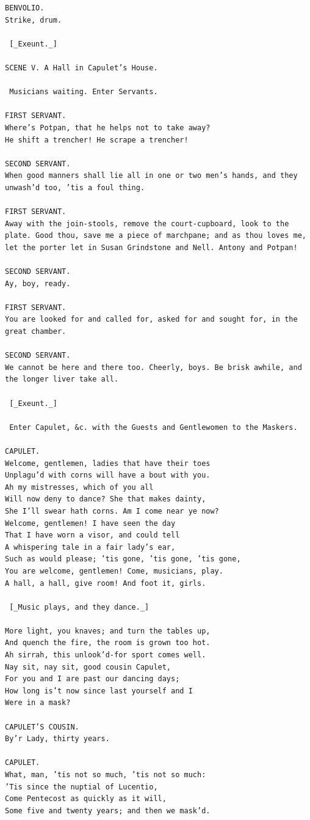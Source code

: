 \documentclass{article}
\begin{document}
\begin{verbatim}
BENVOLIO.
Strike, drum.

 [_Exeunt._]

SCENE V. A Hall in Capulet’s House.

 Musicians waiting. Enter Servants.

FIRST SERVANT.
Where’s Potpan, that he helps not to take away?
He shift a trencher! He scrape a trencher!

SECOND SERVANT.
When good manners shall lie all in one or two men’s hands, and they
unwash’d too, ’tis a foul thing.

FIRST SERVANT.
Away with the join-stools, remove the court-cupboard, look to the
plate. Good thou, save me a piece of marchpane; and as thou loves me,
let the porter let in Susan Grindstone and Nell. Antony and Potpan!

SECOND SERVANT.
Ay, boy, ready.

FIRST SERVANT.
You are looked for and called for, asked for and sought for, in the
great chamber.

SECOND SERVANT.
We cannot be here and there too. Cheerly, boys. Be brisk awhile, and
the longer liver take all.

 [_Exeunt._]

 Enter Capulet, &c. with the Guests and Gentlewomen to the Maskers.

CAPULET.
Welcome, gentlemen, ladies that have their toes
Unplagu’d with corns will have a bout with you.
Ah my mistresses, which of you all
Will now deny to dance? She that makes dainty,
She I’ll swear hath corns. Am I come near ye now?
Welcome, gentlemen! I have seen the day
That I have worn a visor, and could tell
A whispering tale in a fair lady’s ear,
Such as would please; ’tis gone, ’tis gone, ’tis gone,
You are welcome, gentlemen! Come, musicians, play.
A hall, a hall, give room! And foot it, girls.

 [_Music plays, and they dance._]

More light, you knaves; and turn the tables up,
And quench the fire, the room is grown too hot.
Ah sirrah, this unlook’d-for sport comes well.
Nay sit, nay sit, good cousin Capulet,
For you and I are past our dancing days;
How long is’t now since last yourself and I
Were in a mask?

CAPULET’S COUSIN.
By’r Lady, thirty years.

CAPULET.
What, man, ’tis not so much, ’tis not so much:
’Tis since the nuptial of Lucentio,
Come Pentecost as quickly as it will,
Some five and twenty years; and then we mask’d.


\end{verbatim}
\end{document}
